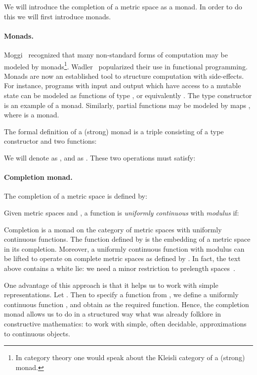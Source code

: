 \documentclass[a4paper,10pt,runningheads]{llncs}
\begin{document}
We will introduce the completion of a metric space as a monad. In order to do this we will first introduce monads.

\paragraph{Monads.} Moggi~{\cite{moggi:1989}} recognized that many non-standard forms of computation may be modeled by monads\footnote{In category theory one would speak about the Kleisli category of a (strong) monad.}. Wadler~{\cite{Wadler92a}} popularized their use in functional programming. Monads are now an established tool to structure computation with side-effects. For instance, programs with input  and output  which have access to a mutable state  can be modeled as functions of type , or equivalently . The type constructor  is an example of a monad. Similarly, partial functions may be modeled by maps , where  is a monad.

The formal definition of a (strong) monad is a triple  consisting of a type
constructor  and two functions:

We will denote  as , and  as . These two operations must satisfy:

\paragraph{Completion monad.}
The completion of a metric space  is defined by:

Given metric spaces  and , a function  is \emph{uniformly continuous} with \emph{modulus}  if:

Completion is a monad on the category of metric spaces with uniformly continuous functions. The function  defined by  is the embedding of a metric space in its completion. Moreover, a uniformly continuous function  with modulus  can be lifted to operate on complete metric spaces as  defined by
. In fact, the text above contains a white lie: we need a minor restriction to prelength spaces~\cite{Oconnor:real}.

One advantage of this approach is that it helps us to work with simple representations. Let . Then to specify a function from , we define a uniformly continuous function , and obtain  as the required function. Hence, the completion monad allows us to do in a structured way what was already folklore in constructive mathematics: to work with simple, often decidable, approximations to continuous objects.
\end{document}
